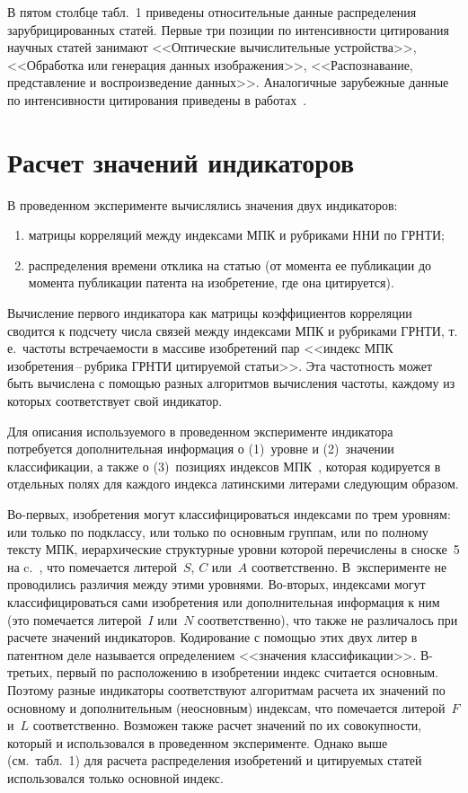 \begin{multicols}{2}
     В пятом столбце табл.~1 приведены относительные данные распределения зарубрицированных статей. Первые три
позиции по интенсивности цитирования научных статей занимают <<Оптические вычислительные устройства>>,
<<Обработка или генерация данных изображения>>, <<Распознавание, представление и воспроизведение данных>>.
Аналогичные зарубежные данные по интенсивности цитирования приведены в работах~\cite{1-zat, 4-zat}.

\section{Расчет значений индикаторов}

     В проведенном эксперименте вычислялись значения двух индикаторов:
     \begin{enumerate}[(1)]
\item матрицы корреляций между индексами МПК и рубриками ННИ по ГРНТИ;
\item распределения времени отклика на статью (от момента ее публикации до момента публикации патента на
изобретение, где она цитируется).
\end{enumerate}

     Вычисление первого индикатора как матрицы коэффициентов корреляции сводится к подсчету числа связей
между индексами МПК и рубриками ГРНТИ, т.\,е.\ частоты встречаемости в массиве изобретений пар <<индекс МПК
изобре\-те\-ния\,--\,руб\-ри\-ка ГРНТИ цитируемой статьи>>. Эта частотность может быть вычислена с помощью разных
алгоритмов вычисления частоты, каждому из которых соответствует свой индикатор.

     Для описания используемого в проведенном эксперименте индикатора потребуется дополнительная информация
о (1)~уровне и (2)~значении классификации, а также о (3)~позициях индексов МПК~\cite{15-zat}, которая кодируется в
отдельных полях для каждого индекса латинскими литерами следующим образом.

     Во-первых, изобретения могут классифицироваться индексами по трем уровням: или только по подклассу, или
только по основным группам, или по полному тексту МПК, иерархические структурные
уровни которой перечислены в сноске~5
на c.~\pageref{snoska},
что помечается литерой~$S$, $C$ или~$A$ соответственно.
В~эксперименте не проводились различия между этими
уровнями. Во-вто\-рых, индексами могут классифицироваться сами изобретения или дополнительная информация к ним
(это помечается литерой~$I$ или~$N$ соответственно), что также
не различалось при расчете значений индикаторов.
Кодирование с помощью этих двух литер в патентном деле называется определением <<значения классификации>>.
     В-третьих, первый по расположению в изобретении индекс считается основным. Поэтому разные индикаторы
соответствуют алгоритмам расчета их значений по основному и дополнительным (неосновным) индексам, что
помечается литерой~$F$ и~$L$ соответственно. Возможен также расчет значений по их совокупности, который и
использовался в проведенном эксперименте. Однако выше (см.\ табл.~1) для расчета распределения изобретений и
цитируемых статей использовался только основной индекс.


\end{multicols}
